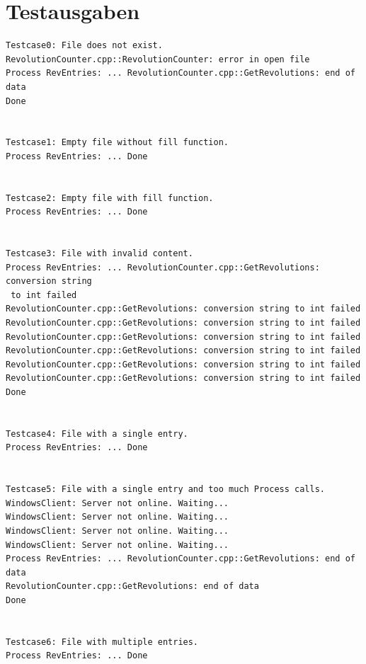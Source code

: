 \documentclass[12pt,a4paper]{article}
\begin{document}
\section {Testausgaben} 

\begin {verbatim}
Testcase0: File does not exist.
RevolutionCounter.cpp::RevolutionCounter: error in open file
Process RevEntries: ... RevolutionCounter.cpp::GetRevolutions: end of data
Done


Testcase1: Empty file without fill function.
Process RevEntries: ... Done


Testcase2: Empty file with fill function.
Process RevEntries: ... Done


Testcase3: File with invalid content.
Process RevEntries: ... RevolutionCounter.cpp::GetRevolutions: conversion string
 to int failed
RevolutionCounter.cpp::GetRevolutions: conversion string to int failed
RevolutionCounter.cpp::GetRevolutions: conversion string to int failed
RevolutionCounter.cpp::GetRevolutions: conversion string to int failed
RevolutionCounter.cpp::GetRevolutions: conversion string to int failed
RevolutionCounter.cpp::GetRevolutions: conversion string to int failed
RevolutionCounter.cpp::GetRevolutions: conversion string to int failed
Done


Testcase4: File with a single entry.
Process RevEntries: ... Done


Testcase5: File with a single entry and too much Process calls.
WindowsClient: Server not online. Waiting...
WindowsClient: Server not online. Waiting...
WindowsClient: Server not online. Waiting...
WindowsClient: Server not online. Waiting...
Process RevEntries: ... RevolutionCounter.cpp::GetRevolutions: end of data
RevolutionCounter.cpp::GetRevolutions: end of data
Done


Testcase6: File with multiple entries.
Process RevEntries: ... Done
\end {verbatim}
\end{document}
